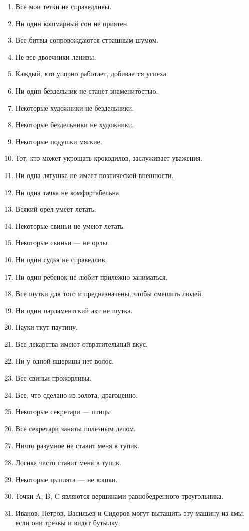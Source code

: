 \documentclass[12pt]{extreport}
\begin{document}
\begin{enumerate}
  \item Все мои тетки не справедливы.
\item  Ни один кошмарный сон не приятен.
\item  Все битвы сопровождаются страшным шумом.
\item Не все двоечники ленивы.
\item  Каждый, кто упорно работает, добивается успеха.
\item  Ни один бездельник не станет знаменитостью.
\item  Некоторые художники не бездельники.
\item  Некоторые бездельники не художники.
\item  Некоторые подушки мягкие.
\item  Тот, кто может укрощать крокодилов, заслуживает уважения.
\item  Ни одна лягушка не имеет поэтической внешности.
\item  Ни одна тачка не комфортабельна.
\item  Всякий орел умеет летать.
\item  Некоторые свиньи не умеют летать.
\item  Некоторые свиньи --- не орлы.
\item  Ни один судья не справедлив.
\item  Ни один ребенок не любит прилежно заниматься.
\item  Все шутки для того и предназначены, чтобы смешить людей.
\item  Ни один парламентский акт не шутка.
\item  Пауки ткут паутину.
\item  Все лекарства имеют отвратительный вкус.
\item  Ни у одной ящерицы нет волос.
\item  Все свиньи прожорливы.
\item  Все, что сделано из золота, драгоценно.
\item  Некоторые секретари --- птицы.
\item  Все секретари заняты полезным делом.
\item  Ничто разумное не ставит меня в тупик.
\item  Логика часто ставит меня в тупик.
\item  Некоторые цыплята --- не кошки.
\item Точки A, B, C являются вершинами равнобедренного треугольника.
\item Иванов, Петров, Васильев и Сидоров могут вытащить эту машину из ямы, если они трезвы и видят бутылку.

\end{enumerate}
\end{document}
